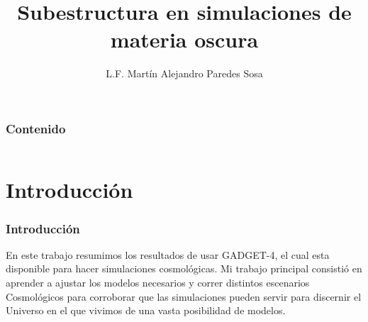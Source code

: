 \documentclass{beamer}
\title[simulaciones de materia oscura]{Subestructura en simulaciones de materia oscura} %
\author{L.F. Martín Alejandro Paredes Sosa} %
\institute[Universidad de Sonora MCF ] %
{
Universidad de Sonora\\ %
\medskip
\textbf{Director}: Dr. Carlos Calcáneo Roldan \\
\medskip
\tiny{Maestría en Ciencias (Física)}\\
\medskip
\tiny{Hermosillo, Sonora a Agosto, 2023 }
}
\date{} %
\begin{document}
{
\begin{frame}
\titlepage %

\end{frame}

\begin{frame}
    \frametitle{Contenido}
    
    \begin{columns}[t]
        
        \begin{column}{.5\textwidth}
            \tableofcontents[sections={1-2}]
        \end{column}

        \begin{column}{.5\textwidth}
            \tableofcontents[sections={3-5}]

        \end{column}

    \end{columns}

\end{frame}
%
%
}
\addtocounter{framenumber}{-1} %


\section{Introducción}
	\begin{frame}
		\frametitle{Introducción}
		
		En este trabajo resumimos los resultados de usar GADGET-4, el cual esta disponible para hacer simulaciones cosmológicas. Mi trabajo principal consistió en aprender a ajustar los modelos necesarios y correr distintos escenarios Cosmológicos para corroborar que las simulaciones pueden servir para discernir el Universo en el que vivimos de una vasta posibilidad de modelos.
		\end{frame}
\end{document}
